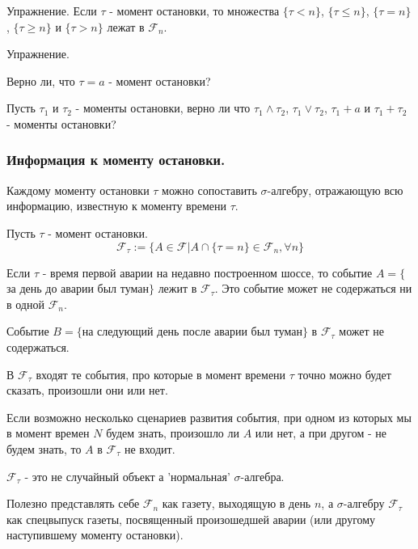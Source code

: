 {Упражнение. Если $\tau$ - момент остановки, то множества $\{\tau<n\}$,
$\{\tau\le n\}$, $\{\tau=n\}$, $\{\tau\ge n\}$ и $\{\tau>n\}$ лежат в
$\mathcal{F}_{n}$. \par



Упражнение. \par
Верно ли, что $\tau=a$ - момент остановки? \par

Пусть $\tau_1$ и $\tau_2$ - моменты остановки, верно ли что $\tau_1\wedge \tau_2$,
$\tau_1\vee \tau_2$, $\tau_1+a$ и $\tau_1+\tau_2$ - моменты остановки? \par

\subsubsection{Информация к моменту остановки.} 

Каждому моменту остановки $\tau$ можно сопоставить $\sigma$-алгебру,
отражающую всю информацию, известную к моменту времени $\tau$. \par
\begin{mydef}
Пусть $\tau$ - момент остановки. 
\begin{equation}
\mathcal{F}_{\tau}:=\{A \in \mathcal{F}|A\cap \{\tau=n \} \in
\mathcal{F}_{n},\forall n\}
\end{equation}
\end{mydef}



\begin{mydef}
Если $\tau$ - время первой аварии на недавно построенном
шоссе, то событие $A=\{$за день до аварии был туман$\}$ лежит в
$\mathcal{F}_{\tau}$. Это событие может не содержаться ни в одной
$\mathcal{F}_{n}$. \par
Событие $B=\{$на следующий день после аварии был туман$\}$ в
$\mathcal{F}_{\tau}$ может не содержаться. 
\end{mydef}




В $\mathcal{F}_{\tau}$ входят те события, про которые в момент
времени $\tau$ точно можно будет
сказать, произошли они или нет.\par
Если возможно несколько сценариев развития события, при одном из
которых мы в момент времен $N$ будем знать, произошло ли $A$ или
нет, а при другом - не будем знать, то $A$ в $\mathcal{F}_{\tau}$ не
входит. \par
$\mathcal{F}_{\tau}$ - это не случайный объект а 'нормальная'
$\sigma$-алгебра. \par
Полезно представлять себе $\mathcal{F}_{n}$ как газету, выходящую
в день $n$, а $\sigma$-алгебру $\mathcal{F}_{\tau}$ как спецвыпуск
газеты, посвященный произошедшей аварии (или другому наступившему
моменту остановки). \par

}
